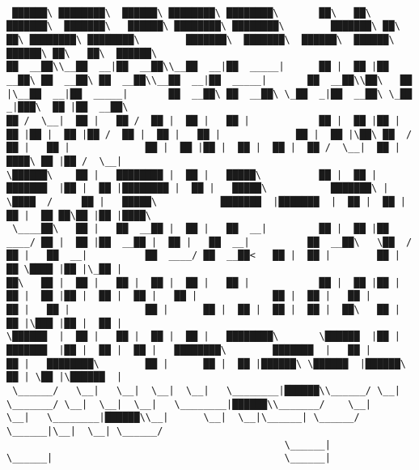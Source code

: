 \documentclass[varwidth=\maxdimen,margin=0.5cm,multi={verbatim}]{standalone}
\begin{document}
\begin{verbatim}

 ██████\ ████████\  ██████\ ████████\ ████████\       ██\   ██\ ███████\  ███████\   ██████\ ████████\ ████████\        ███████\ ██\     ██\ ████████\ ████████\        ███████\  ███████\  ██████\  ██████\  ██████\ ██\   ██\  ██████\
██  __██\\__██  __|██  __██\\__██  __|██  _____|      ██ |  ██ |██  __██\ ██  __██\ ██  __██\\__██  __|██  _____|       ██  __██\\██\   ██  |\__██  __|██  _____|       ██  __██\ ██  __██\ \_██  _|██  __██\ \_██  _|███\  ██ |██  __██\
██ /  \__|  ██ |   ██ /  ██ |  ██ |   ██ |            ██ |  ██ |██ |  ██ |██ |  ██ |██ /  ██ |  ██ |   ██ |             ██ |  ██ |\██\ ██  /    ██ |   ██ |             ██ |  ██ |██ |  ██ |  ██ |  ██ /  \__|  ██ |  ████\ ██ |██ /  \__|
\██████\    ██ |   ████████ |  ██ |   █████\          ██ |  ██ |███████  |██ |  ██ |████████ |  ██ |   █████\           ███████\ | \████  /     ██ |   █████\           ███████  |███████  |  ██ |  ██ |        ██ |  ██ ██\██ |██ |████\
 \____██\   ██ |   ██  __██ |  ██ |   ██  __|         ██ |  ██ |██  ____/ ██ |  ██ |██  __██ |  ██ |   ██  __|          ██  __██\   \██  /      ██ |   ██  __|          ██  ____/ ██  __██<   ██ |  ██ |        ██ |  ██ \████ |██ |\_██ |
██\   ██ |  ██ |   ██ |  ██ |  ██ |   ██ |            ██ |  ██ |██ |      ██ |  ██ |██ |  ██ |  ██ |   ██ |             ██ |  ██ |   ██ |       ██ |   ██ |             ██ |      ██ |  ██ |  ██ |  ██ |  ██\   ██ |  ██ |\███ |██ |  ██ |
\██████  |  ██ |   ██ |  ██ |  ██ |   ████████\       \██████  |██ |      ███████  |██ |  ██ |  ██ |   ████████\        ███████  |   ██ |       ██ |   ████████\        ██ |      ██ |  ██ |██████\ \██████  |██████\ ██ | \██ |\██████  |
 \______/   \__|   \__|  \__|  \__|   \________|██████\\______/ \__|      \_______/ \__|  \__|  \__|   \________|██████\\_______/    \__|       \__|   \________|██████\\__|      \__|  \__|\______| \______/ \______|\__|  \__| \______/
                                                \______|                                                         \______|                                        \______|



\end{verbatim}
\end{document}
